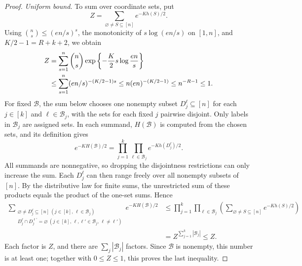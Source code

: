 \documentclass[10pt,a4paper]{amsart}
\numberwithin{equation}{section}
\begin{document}
\begin{proof}
\smallskip\noindent\emph{Uniform bound.}
To sum over coordinate sets, put
\[
 Z=\sum_{\varnothing\ne S\subseteq[n]}e^{-K h(S)/2}.
\]
Using $\binom ns\le(en/s)^s$, the monotonicity of $s\log(en/s)$ on
$[1,n]$, and $K/2-1=R+k+2$, we obtain
\begin{align}
 Z
 &=\sum_{s=1}^n\binom ns
       \exp\left\{-\frac K2s\log\frac{en}{s}\right\}\notag\\
 &\le\sum_{s=1}^n(en/s)^{-(K/2-1)s}
 \le n(en)^{-(K/2-1)}
 \le n^{-R-1}\le1.
 \label{eq:Z}
\end{align}
For fixed $\mathcal B$, the sum below chooses one nonempty subset
$D_j^\ell\subseteq[n]$ for each $j\in[k]$ and $\ell\in\mathcal B_j$,
with the sets for each fixed $j$ pairwise disjoint. Only labels in
$\mathcal B_j$ are assigned sets. In each summand, $H(\mathcal B)$
is computed from the chosen sets, and its definition gives
\[
 e^{-K H(\mathcal B)/2}
 =\prod_{j=1}^k\prod_{\ell\in\mathcal B_j}e^{-K h(D_j^\ell)/2}.
\]
All summands are nonnegative, so dropping the disjointness restrictions
can only increase the sum. Each $D_j^\ell$ can then range freely over
all nonempty subsets of $[n]$. By the distributive law for finite sums,
the unrestricted sum of these products equals the product of the
one-set sums. Hence
\begin{align*}
 \sum_{\substack{\varnothing\ne D_j^\ell\subseteq[n]\ (j\in[k],\,\ell\in\mathcal B_j)\\
                  D_j^\ell\cap D_j^{\ell'}=\varnothing\ (j\in[k],\,\ell,\ell'\in\mathcal B_j,\,\ell\ne\ell')}}
       e^{-K H(\mathcal B)/2}
 &\le\prod_{j=1}^k\prod_{\ell\in\mathcal B_j}
       \left(\sum_{\varnothing\ne S\subseteq[n]}e^{-K h(S)/2}\right)\\
 &=Z^{\sum_{j=1}^k|\mathcal B_j|}\le Z.
\end{align*}
Each factor is $Z$, and there are $\sum_j|\mathcal B_j|$ factors.
Since $\mathcal B$ is nonempty, this number is at least one;
together with $0\le Z\le1$, this proves the last inequality.


\end{proof}
\end{document}
